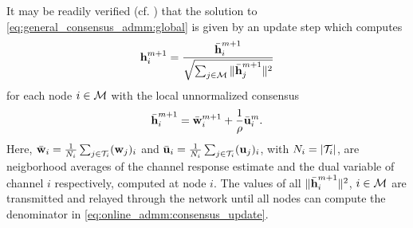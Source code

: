 \documentclass{article}
\begin{document}
It may be readily verified (cf. \cite{boydDistributedOptimizationStatistical2011}) that the solution to \eqref{eq:general_consensus_admm:global} is given by an update step which computes
\begin{equation}
    \bm{\mathrm{h}}_i^{m+1} = \frac{\bar{\bm{\mathrm{h}}}_i^{m+1}}{\sqrt{\sum_{j \in \mathcal{M}} \|\bar{\bm{\mathrm{h}}}_j^{m+1}\|^2}}\label{eq:online_admm:consensus_update}
\end{equation}
for each node \(i \in \mathcal{M}\) with the local unnormalized consensus
\begin{equation}
    \bar{\bm{\mathrm{h}}}_i^{m+1} = \bar{\bm{\mathrm{w}}}_i^{m+1} + \frac{1}{\rho} \bar{\bm{\mathrm{u}}}_i^{m}.
\end{equation}
Here, \(\bar{\bm{\mathrm{w}}}_i = \frac{1}{N_i} \sum_{j \in \mathcal{T}_i} (\bm{\mathrm{w}}_j)_i\) and \(\bar{\bm{\mathrm{u}}}_i = \frac{1}{N_i} \sum_{j \in \mathcal{T}_i} (\bm{\mathrm{u}}_j)_i\), with \(N_i = | \mathcal{T}_i |\), are neigborhood averages of the channel response estimate and the dual variable of channel \(i\) respectively, computed at node \(i\). The values of all \(\|\bar{\bm{\mathrm{h}}}_i^{m+1}\|^2\), \(i \in \mathcal{M}\) are transmitted and relayed through the network until all nodes can compute the denominator in \eqref{eq:online_admm:consensus_update}.
\end{document}
